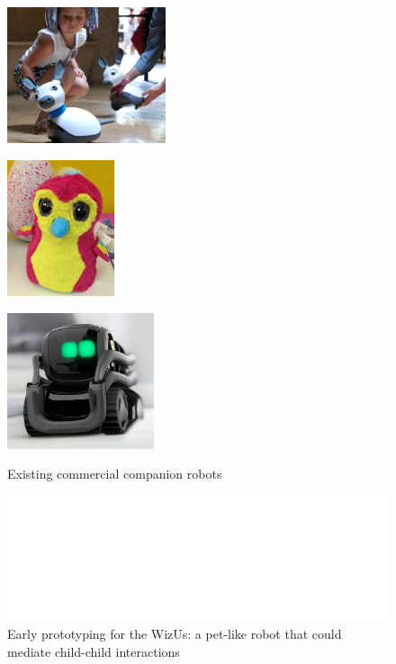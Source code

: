\documentclass[11pt]{report}
\newcommand{\project}{WizUs\xspace}
\begin{document}
\begin{figure}[!htbp]
    \begin{minipage}[b]{.3\linewidth}
        \centering\includegraphics[height=4cm]{figs/miro.jpg}
        \label{fig:miro}
    \end{minipage}%
    \hspace{0.1cm}
    \begin{minipage}[b]{.3\linewidth}
        \centering
        \includegraphics[height=4cm]{figs/hatchnimals.jpg}
        \label{fig:hatchimals}
    \end{minipage}%
    \hspace{0.1cm}
    \begin{minipage}[b]{.3\linewidth}
        \centering
        \includegraphics[height=4cm]{figs/anki-vector.jpg}
        \label{fig:vector}
    \end{minipage}
    \caption{Existing commercial companion robots}\label{fig:commercial-robots}
\end{figure}



\begin{figure}
    \centering
    \includegraphics[width=0.9\linewidth]{figs/wizme+dolls}
    \caption{Early prototyping for the \project: a pet-like robot that could
    mediate child-child interactions}
    \label{}
\end{figure}
\end{document}
